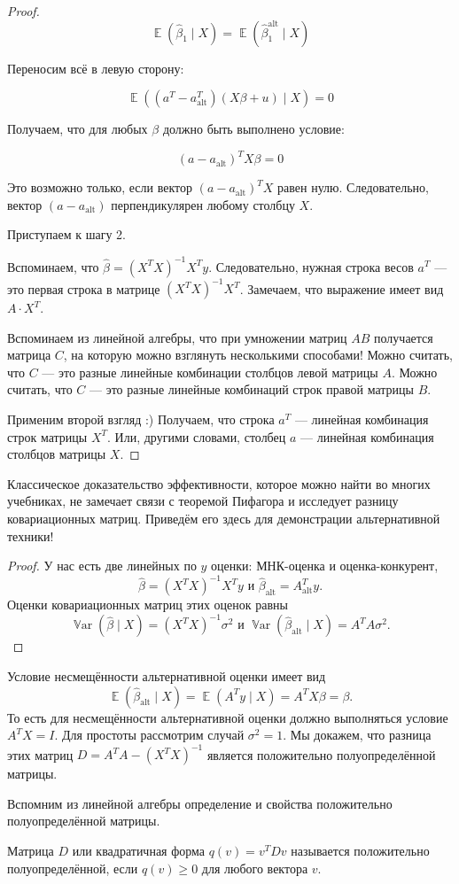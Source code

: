 \documentclass[12pt]{article}
\DeclareMathOperator{\Var}{\mathbb{V}ar}
\DeclareMathOperator{\E}{\mathbb{E}}
\newcommand{\hb}{\hat{\beta}}
\newcommand{\alt}{\text{alt}}
\begin{document}
\begin{proof}
\[
\E(\hat\beta_1 \mid X) = \E(\hat\beta_1^{\alt} \mid X)
\]

Переносим всё в левую сторону:

\[
\E((a^T - a^T_{\alt})(X\beta + u) \mid X) = 0
\]

Получаем, что для любых $\beta$ должно быть выполнено условие:

\[
(a - a_{\alt})^T X\beta = 0
\]

Это возможно только, если вектор $(a - a_{\alt})^T X$ равен нулю. 
Следовательно, вектор $(a - a_{\alt})$ перпендикулярен любому столбцу $X$.


Приступаем к шагу 2.

Вспоминаем, что $\hat \beta = (X^T X)^{-1}X^T y$. Следовательно, нужная строка весов $a^T$ — 
это первая строка в матрице $(X^TX)^{-1}X^T$. 
Замечаем, что выражение имеет вид $A \cdot X^T$. 

Вспоминаем из линейной алгебры, что при умножении матриц $AB$ получается матрица $C$, 
на которую можно взглянуть несколькими способами!
Можно считать, что $C$ — это разные линейные комбинации столбцов левой матрицы $A$. 
Можно считать, что $C$ — это разные линейные комбинаций строк правой матрицы $B$.

Применим второй взгляд :) Получаем, что строка $a^T$ — линейная комбинация строк матрицы $X^T$. 
Или, другими словами, столбец $a$ — линейная комбинация столбцов матрицы $X$.
\end{proof}

Классическое доказательство эффективности, которое можно найти во многих учебниках, не замечает связи с теоремой Пифагора и исследует разницу ковариационных матриц. 
Приведём его здесь для демонстрации альтернативной техники!
\begin{proof}
У нас есть две линейных по $y$ оценки: МНК-оценка и оценка-конкурент,
\[
\hb = (X^TX)^{-1}X^T y \text{ и } \hb_{\alt} = A^T_{\alt} y.
\]
Оценки ковариационных матриц этих оценок равны 
\[
\Var(\hb \mid X) = (X^TX)^{-1} \sigma^2 \text{ и } \Var(\hb_{\alt} \mid X) = A^TA \sigma^2.
\]
\end{proof}
Условие несмещённости альтернативной оценки имеет вид 
\[
\E(\hb_{\alt} \mid X) = \E(A^T y \mid X) = A^T X\beta = \beta.
\]
То есть для несмещённости альтернативной оценки должно выполняться условие $A^T X = I$.
Для простоты рассмотрим случай $\sigma^2 = 1$.
Мы докажем, что разница этих матриц $D = A^TA - (X^TX)^{-1}$ является положительно полуопределённой матрицы. 

Вспомним из линейной алгебры определение и свойства положительно полуопределённой матрицы.
\begin{definition}
Матрица $D$ или квадратичная форма $q(v) = v^T D v$ называется положительно полуопределённой, если $q(v) \geq 0$ для любого вектора $v$.
\end{definition}
\end{document}
